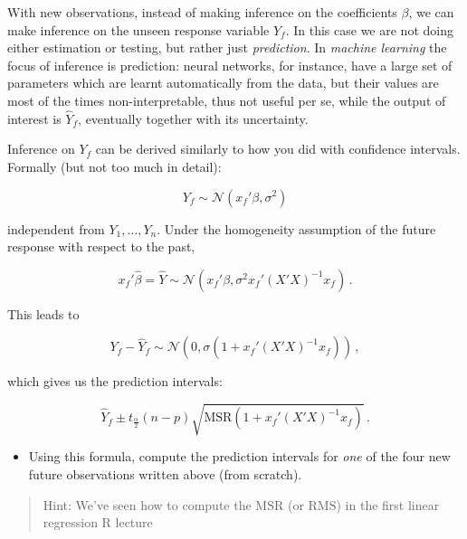 \documentclass[
  oneside]{book}
\providecommand{\tightlist}{%
  \setlength{\itemsep}{0pt}\setlength{\parskip}{0pt}}
\begin{document}
With new observations, instead of making inference on the coefficients \(\beta\),
we can make inference on the unseen response variable \(Y_f\). In this
case we are not doing either estimation or testing, but rather just \emph{prediction}.
In \emph{machine learning} the focus of inference is prediction: neural networks, for
instance, have a large set of parameters which are learnt automatically from the data,
but their values are most of the times non-interpretable, thus not useful per se, while
the output of interest is \(\hat Y_f\), eventually together with its uncertainty.

Inference on \(Y_f\) can be derived similarly to how you did with confidence intervals.
Formally (but not too much in detail):

\[
Y_f \sim \mathcal N(x_f'\beta, \sigma^2)
\]

independent from \(Y_1, ..., Y_n\). Under the homogeneity assumption of the future
response with respect to the past,

\[
x_f'\hat\beta = \hat Y \sim \mathcal N(x_f'\beta, \sigma^2 x_f' (X'X)^{-1}x_f)\,.
\]

This leads to

\[
Y_f - \hat Y_f \sim \mathcal N(0, \sigma(1 + x_f'(X'X)^{-1}x_f))\,,
\]

which gives us the prediction intervals:

\[
\hat Y_f \pm t_{\frac{\alpha}{2}}(n-p)\sqrt{\text{MSR}(1 + x_f'(X'X)^{-1}x_f)}\,.
\]

\begin{itemize}
\tightlist
\item
  Using this formula, compute the prediction intervals for \emph{one} of the
  four new future observations written above (from scratch).
\end{itemize}

\begin{quote}
Hint: We've seen how to compute the \(\text{MSR}\) (or \(\text{RMS}\)) in the first
linear regression R lecture
\end{quote}
\end{document}
